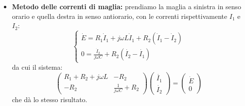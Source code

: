 \documentclass[a4paper,11pt]{article}
\begin{document}
\begin{itemize}
\item \textbf{Metodo delle correnti di maglia:} prendiamo la maglia a sinistra in senso orario e quella destra in senso antiorario, con le correnti rispettivamente $I_1$ e $I_2$:
\[
	\begin{cases}
		\dot{E} = R_1 \dot{I}_1 + j \omega L \dot{I}_1 + R_2\left(\dot{I}_1 - \dot{I}_2 \right) \\ 
		0 = \frac{\dot{I}_2}{j \omega C} + R_2\left(\dot{I_2} - \dot{I_1}\right)
	\end{cases}
\]
da cui il sistema:
$$
\begin{pmatrix}
	R_1 + R_2 + j \omega L & -R_2 \\ 
	-R_2 & \frac{1}{j \omega C} + R_2
\end{pmatrix}
\begin{pmatrix}
	\dot{I_1} \\ \dot{I_2}
\end{pmatrix}
=
\begin{pmatrix}
	\dot{E} \\ 0
\end{pmatrix}
$$
che dà lo stesso risultato.
\end{itemize}
\end{document}
